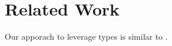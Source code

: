 \section{Related Work}
Our apporach to leverage types is similar to \cite{astrauskas2019leveraging}.